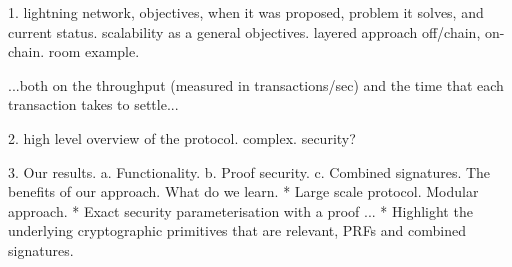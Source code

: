 
1. lightning network, objectives, when it was proposed, problem it solves, and current status. scalability as a general objectives. layered approach off/chain, on-chain. room example.

...both on the throughput (measured in transactions/sec) and the time that each
transaction takes to settle...

2. high level overview of the protocol. complex. security?

3. Our results.
a. Functionality.
b. Proof security.
c. Combined signatures.
The benefits of our approach.
What do we learn.
 * Large scale protocol. Modular approach.
 * Exact security parameterisation with a proof ...
 * Highlight the underlying cryptographic primitives that are relevant,
 PRFs  and combined signatures.

